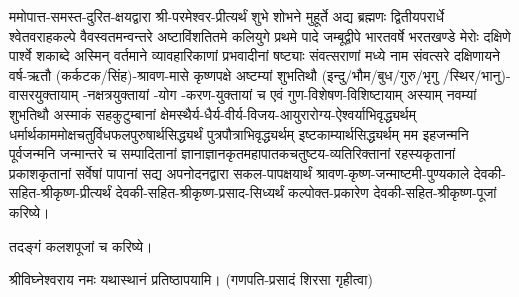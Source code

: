 ममोपात्त-समस्त-दुरित-क्षयद्वारा श्री-परमेश्वर-प्रीत्यर्थं शुभे शोभने मुहूर्ते अद्य ब्रह्मणः
द्वितीयपरार्धे श्वेतवराहकल्पे वैवस्वतमन्वन्तरे अष्टाविंशतितमे कलियुगे प्रथमे पादे
जम्बूद्वीपे भारतवर्षे भरतखण्डे मेरोः दक्षिणे पार्श्वे शकाब्दे अस्मिन् वर्तमाने व्यावहारिकाणां
प्रभवादीनां षष्ट्याः संवत्सराणां मध्ये \blank{} नाम संवत्सरे दक्षिणायने वर्ष-ऋतौ (कर्कटक/सिंह)-श्रावण-मासे
कृष्णपक्षे अष्टम्यां शुभतिथौ (इन्दु/भौम/बुध/गुरु/भृगु /स्थिर/भानु)-वासरयुक्तायाम्
\blank-नक्षत्रयुक्तायां \blank-योग \blank-करण-युक्तायां च एवं गुण-विशेषण-विशिष्टायाम्
अस्याम् नवम्यां शुभतिथौ अस्माकं सहकुटुम्बानां क्षेमस्थैर्य-धैर्य-वीर्य-विजय-आयुरारोग्य-ऐश्वर्याभिवृद्ध्यर्थम्
धर्मार्थकाममोक्ष\-चतुर्विधफलपुरुषार्थसिद्ध्यर्थं पुत्रपौत्राभिवृद्ध्यर्थम् इष्टकाम्यार्थसिद्ध्यर्थम्
मम इहजन्मनि पूर्वजन्मनि जन्मान्तरे च सम्पादितानां ज्ञानाज्ञानकृतमहा\-पातकचतुष्टय-व्यतिरिक्तानां रहस्यकृतानां प्रकाशकृतानां सर्वेषां पापानां सद्य अपनोदनद्वारा सकल-पापक्षयार्थं
श्रावण-कृष्ण-जन्माष्टमी-पुण्यकाले देवकी-सहित-श्रीकृष्ण-प्रीत्यर्थं देवकी-सहित-श्रीकृष्ण-प्रसाद-सिध्यर्थं कल्पोक्त-प्रकारेण देवकी-सहित-श्रीकृष्ण-पूजां करिष्ये।

तदङ्गं कलशपूजां च करिष्ये।

श्रीविघ्नेश्वराय नमः यथास्थानं प्रतिष्ठापयामि।
(गणपति-प्रसादं शिरसा गृहीत्वा)














